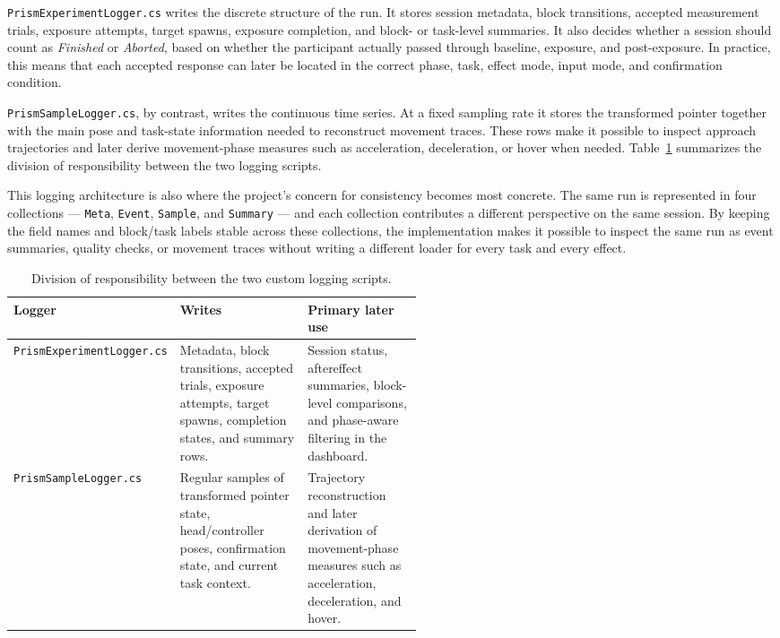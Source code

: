 \texttt{PrismExperimentLogger.cs} writes the discrete structure of the run. It stores session metadata, block transitions, accepted measurement trials, exposure attempts, target spawns, exposure completion, and block- or task-level summaries. It also decides whether a session should count as \emph{Finished} or \emph{Aborted}, based on whether the participant actually passed through baseline, exposure, and post-exposure. In practice, this means that each accepted response can later be located in the correct phase, task, effect mode, input mode, and confirmation condition.

\texttt{PrismSampleLogger.cs}, by contrast, writes the continuous time series. At a fixed sampling rate it stores the transformed pointer together with the main pose and task-state information needed to reconstruct movement traces. These rows make it possible to inspect approach trajectories and later derive movement-phase measures such as acceleration, deceleration, or hover when needed. Table~\ref{tab:prism-logger-split} summarizes the division of responsibility between the two logging scripts.

This logging architecture is also where the project's concern for consistency becomes most concrete. The same run is represented in four collections --- \texttt{Meta}, \texttt{Event}, \texttt{Sample}, and \texttt{Summary} --- and each collection contributes a different perspective on the same session. By keeping the field names and block/task labels stable across these collections, the implementation makes it possible to inspect the same run as event summaries, quality checks, or movement traces without writing a different loader for every task and every effect.

\begin{table}[H]
    \centering
    \footnotesize
    \setlength{\tabcolsep}{5pt}
    \renewcommand{\arraystretch}{1.18}
    \begin{tabularx}{\linewidth}{|
        >{\raggedright\arraybackslash}p{0.25\linewidth}|
        >{\raggedright\arraybackslash}X|
        >{\raggedright\arraybackslash}p{0.28\linewidth}|}
        \hline
        \textbf{Logger} & \textbf{Writes} & \textbf{Primary later use} \\
        \hline
        \texttt{PrismExperimentLogger.cs} & Metadata, block transitions, accepted trials, exposure attempts, target spawns, completion states, and summary rows. & Session status, aftereffect summaries, block-level comparisons, and phase-aware filtering in the dashboard. \\
        \hline
        \texttt{PrismSampleLogger.cs} & Regular samples of transformed pointer state, head/controller poses, confirmation state, and current task context. & Trajectory reconstruction and later derivation of movement-phase measures such as acceleration, deceleration, and hover. \\
        \hline
    \end{tabularx}
    \caption{Division of responsibility between the two custom logging scripts.}
    \label{tab:prism-logger-split}
\end{table}

